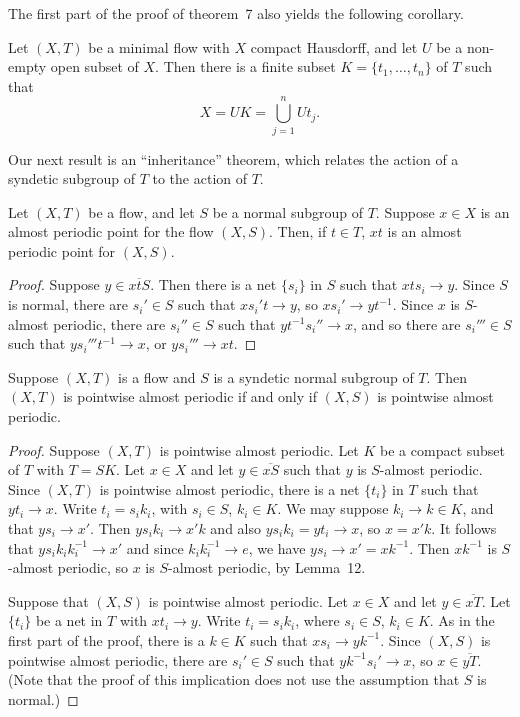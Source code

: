 The first part of the proof of theorem~7 also yields the following corollary.

\begin{corollary*}[11]
    Let $(X,T)$ be a minimal flow with $X$ compact Hausdorff, and let $U$ be a non-empty open subset of $X$. Then there is a finite subset $K = \{t_1, \ldots, t_n\}$ of $T$ such that
    \[
        X = UK = \bigcup_{j=1}^{n} U t_j.
    \]
\end{corollary*}

Our next result is an ``inheritance'' theorem, which relates the action of a syndetic subgroup of $T$ to the action of $T$.


\begin{lemma*}[12]
    Let $(X,T)$ be a flow, and let $S$ be a normal subgroup of $T$. Suppose $x \in X$ is an almost periodic point for the flow $(X,S)$. Then, if $t \in T$, $xt$ is an almost periodic point for $(X,S)$.
\end{lemma*}

\begin{proof}
    Suppose $y \in \overline{xtS}$. Then there is a net $\{s_i\}$ in $S$ such that $xts_i \to y$. Since $S$ is normal, there are $s_i' \in S$ such that $xs_i't \to y$, so $xs_i' \to yt^{-1}$. Since $x$ is $S$-almost periodic, there are $s_i'' \in S$ such that $yt^{-1}s_i'' \to x$, and so there are $s_i''' \in S$ such that $ys_i'''t^{-1} \to x$, or $ys_i''' \to xt$.
\end{proof}


\begin{theorem*}[13]
    Suppose $(X,T)$ is a flow and $S$ is a syndetic normal subgroup of $T$. Then $(X,T)$ is pointwise almost periodic if and only if $(X,S)$ is pointwise almost periodic.
\end{theorem*}

\begin{proof}
    Suppose $(X,T)$ is pointwise almost periodic. Let $K$ be a compact subset of $T$ with $T = SK$. Let $x \in X$ and let $y \in \overline{xS}$ such that $y$ is $S$-almost periodic. Since $(X,T)$ is pointwise almost periodic, there is a net $\{t_i\}$ in $T$ such that $yt_i \to x$. Write $t_i = s_i k_i$, with $s_i \in S$, $k_i \in K$. We may suppose $k_i \to k \in K$, and that $ys_i \to x'$. Then $ys_i k_i \to x'k$ and also $ys_i k_i = yt_i \to x$, so $x = x'k$. It follows that $ys_i k_i k_i^{-1} \to x'$ and since $k_i k_i^{-1} \to e$, we have $ys_i \to x' = xk^{-1}$. Then $xk^{-1}$ is $S$-almost periodic, so $x$ is $S$-almost periodic, by Lemma~12.

    Suppose that $(X,S)$ is pointwise almost periodic. Let $x \in X$ and let $y \in \overline{xT}$. Let $\{t_i\}$ be a net in $T$ with $xt_i \to y$. Write $t_i = s_i k_i$, where $s_i \in S$, $k_i \in K$. As in the first part of the proof, there is a $k \in K$ such that $xs_i \to yk^{-1}$. Since $(X,S)$ is pointwise almost periodic, there are $s_i' \in S$ such that $yk^{-1}s_i' \to x$, so $x \in \overline{yT}$. (Note that the proof of this implication does not use the assumption that $S$ is normal.)
\end{proof}



